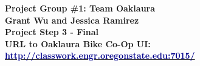 \documentclass{article}
\begin{document}
\begin{center}
\large\textcolor{primarycolor}{\textbf{Project Group \#1: Team Oaklaura}}\\[0.3cm]
\large\textbf{Grant Wu and Jessica Ramirez}\\[0.3cm]
\huge\textbf{Project Step 3 - Final}\\[0.5cm]

\large\textbf{URL to Oaklaura Bike Co-Op UI:}\\[0.5cm]
\large\href{http://classwork.engr.oregonstate.edu:7015/}{\textcolor{darkblue}{\textbf{http://classwork.engr.oregonstate.edu:7015/}}}\\[1.25cm]
\end{center}
\end{document}
